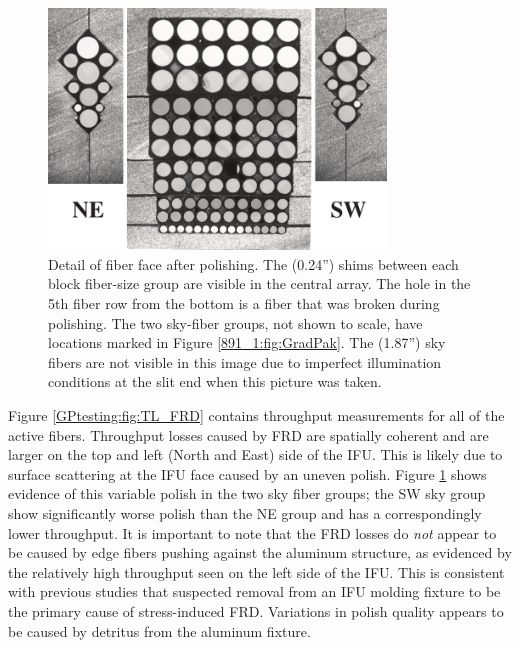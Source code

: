 \begin{figure}
  \centering
  \includegraphics[width=0.8\textwidth]{Appendix/figs/gradpak_facefig.pdf}
  \caption[\GP face and polishing
  detail]{\label{GPtesting:fig:gradpak_face}\fixspacing Detail of \GP
    fiber face
    after polishing. The  (0.24'') shims between each
    block fiber-size group are visible in the central array. The hole
    in the 5th fiber row from the bottom is a fiber that was broken
    during polishing. The two sky-fiber groups, not shown to scale,
    have locations marked in Figure \ref{891_1:fig:GradPak}.  The
     (1.87'') sky fibers are not visible in this image
    due to imperfect illumination conditions at the slit end when this
    picture was taken.}
\end{figure}

Figure \ref{GPtesting:fig:TL_FRD} contains throughput measurements for all of
the active \GP fibers. Throughput losses caused by FRD are spatially
coherent and are larger on the top and left (North and East) side of
the IFU. This is likely due to surface scattering at the IFU face
\citep{Eigenbrot12} caused by an uneven polish. Figure
\ref{GPtesting:fig:gradpak_face} shows evidence of this variable polish in the
two sky fiber groups; the SW sky group show significantly worse polish
than the NE group and has a correspondingly lower throughput. It is
important to note that the FRD losses do \emph{not} appear to be
caused by edge fibers pushing against the aluminum structure, as
evidenced by the relatively high throughput seen on the left side of
the IFU. This is consistent with previous studies \citep{Bershady04}
that suspected removal from an IFU molding fixture to be the primary
cause of stress-induced FRD. Variations in polish quality appears to
be caused by detritus from the aluminum fixture.

